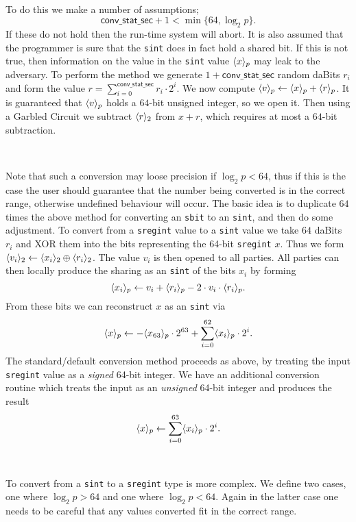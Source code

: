 ~

To do this we make a number of assumptions;
\[ \mathsf{conv\_stat\_sec}+1 < \min \{ 64, \log_2 p \}.  \]
If these do not hold then the run-time system will abort.
It is also assumed that the programmer is sure that the \verb|sint|
does in fact hold a shared bit.
If this is not true, then information on the value in the
\verb|sint| value $\langle x \rangle_p$ may leak to the adversary.
To perform the method we generate $1+\mathsf{conv\_stat\_sec}$ random
daBits $r_i$ and form the value
$r = \sum_{i=0}^{\mathsf{conv\_stat\_sec}} r_i \cdot 2^i$.
We now compute $\langle v \rangle_p \leftarrow \langle x \rangle_p + \langle r \rangle_p$.
It is guaranteed that $\langle v \rangle_p$ holds a $64$-bit unsigned integer,
so we open it.
Then using a Garbled Circuit we subtract $\langle r \rangle_2$ from $x+r$,
which requires at most a $64$-bit subtraction.

~

Note that such a conversion may loose precision if
$\log_2 p < 64$, thus if this is the case the user should guarantee
that the number being converted is in the correct range, otherwise
undefined behaviour will occur.
The basic idea is to duplicate $64$ times the above method for converting
an \verb|sbit| to an \verb|sint|, and then do some adjustment.
To convert from a \verb|sregint| value to a \verb|sint| value we take
$64$ daBits $r_i$ and XOR them into the bits representing the 64-bit
\verb|sregint| $x$.
Thus we form $\langle v_i \rangle_2 \leftarrow \langle x_i \rangle_2 \oplus \langle r_i \rangle_2$.
The value $v_i$ is then opened to all parties.
All parties can then locally produce the sharing as an \verb|sint|
of the bits $x_i$ by forming
\[  \langle x_i \rangle_p \leftarrow v_i + \langle r_i \rangle_p - 2 \cdot v_i \cdot \langle r_i \rangle_p. \]
From these bits we can reconstruct $x$ as an \verb|sint| via
\[ \langle x \rangle_p \leftarrow - \langle x_{63} \rangle_p \cdot 2^{63} + \sum_{i=0}^{62} \langle x_i \rangle_p \cdot 2^i. \]
The standard/default conversion method proceeds as above, by treating
the input \verb|sregint| value as a {\em signed} 64-bit integer.
We have an additional conversion routine which treats the input as an
  {\em unsigned} 64-bit integer and produces the result
\[ \langle x \rangle_p \leftarrow \sum_{i=0}^{63} \langle x_i \rangle_p \cdot 2^i. \]


~

To convert from a \verb|sint| to a \verb|sregint| type is more complex.
We define two cases, one where $\log_2 p > 64$ and one where $\log_2 p < 64$.
Again in the latter case one needs to be careful that any values converted
fit in the correct range.

